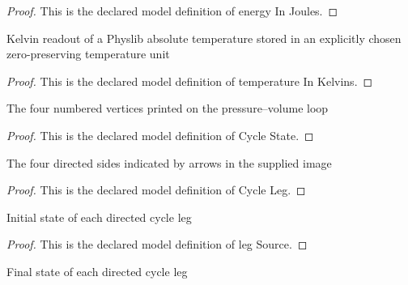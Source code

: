 \begin{proof}
  This is the declared model definition of energy In Joules.
\end{proof}
\begin{definition}
  \label{def:physics:phyx-mini-0480:phyxminiproblems-problemphyxmini0480-temperatureinkelvins}
  Kelvin readout of a Physlib absolute temperature stored in an explicitly chosen zero-preserving temperature unit
\end{definition}
\begin{proof}
  This is the declared model definition of temperature In Kelvins.
\end{proof}
\begin{definition}
  \label{def:physics:phyx-mini-0480:phyxminiproblems-problemphyxmini0480-cyclestate}
  The four numbered vertices printed on the pressure--volume loop
\end{definition}
\begin{proof}
  This is the declared model definition of Cycle State.
\end{proof}
\begin{definition}
  \label{def:physics:phyx-mini-0480:phyxminiproblems-problemphyxmini0480-cycleleg}
  The four directed sides indicated by arrows in the supplied image
\end{definition}
\begin{proof}
  This is the declared model definition of Cycle Leg.
\end{proof}
\begin{definition}
  \label{def:physics:phyx-mini-0480:phyxminiproblems-problemphyxmini0480-legsource}
  Initial state of each directed cycle leg
\end{definition}
\begin{proof}
  This is the declared model definition of leg Source.
\end{proof}
\begin{definition}
  \label{def:physics:phyx-mini-0480:phyxminiproblems-problemphyxmini0480-legtarget}
  Final state of each directed cycle leg
\end{definition}
